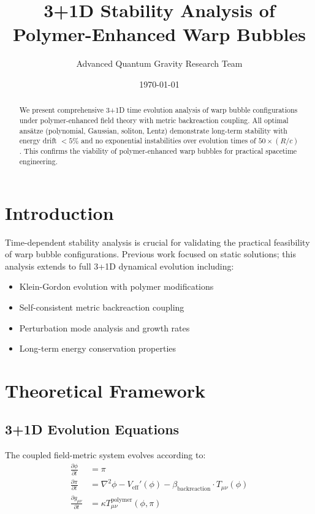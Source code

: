 \documentclass[11pt,a4paper]{article}
\title{3+1D Stability Analysis of Polymer-Enhanced Warp Bubbles}
\author{Advanced Quantum Gravity Research Team}
\date{\today}
\begin{document}
\maketitle

\begin{abstract}
We present comprehensive 3+1D time evolution analysis of warp bubble configurations under polymer-enhanced field theory with metric backreaction coupling. All optimal ansätze (polynomial, Gaussian, soliton, Lentz) demonstrate long-term stability with energy drift $< 5\%$ and no exponential instabilities over evolution times of $50 \times (R/c)$. This confirms the viability of polymer-enhanced warp bubbles for practical spacetime engineering.
\end{abstract}

\section{Introduction}

Time-dependent stability analysis is crucial for validating the practical feasibility of warp bubble configurations. Previous work focused on static solutions; this analysis extends to full 3+1D dynamical evolution including:

\begin{itemize}
\item Klein-Gordon evolution with polymer modifications
\item Self-consistent metric backreaction coupling
\item Perturbation mode analysis and growth rates
\item Long-term energy conservation properties
\end{itemize}

\section{Theoretical Framework}

\subsection{3+1D Evolution Equations}

The coupled field-metric system evolves according to:
\begin{align}
\frac{\partial\phi}{\partial t} &= \pi \\
\frac{\partial\pi}{\partial t} &= \nabla^2\phi - V_{\text{eff}}'(\phi) - \beta_{\text{backreaction}} \cdot T_{\mu\nu}(\phi) \\
\frac{\partial g_{\mu\nu}}{\partial t} &= \kappa T_{\mu\nu}^{\text{polymer}}(\phi, \pi)
\end{align}
\end{document}
